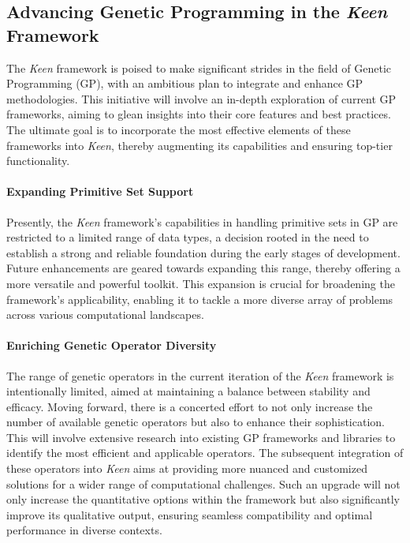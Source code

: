         \subsection{Advancing Genetic Programming in the \textit{Keen} Framework}
        \label{sec:future:gp}
            The \textit{Keen} framework is poised to make significant strides in the field of Genetic Programming (GP), 
            with an ambitious plan to integrate and enhance GP methodologies. This initiative will involve an in-depth 
            exploration of current GP frameworks, aiming to glean insights into their core features and best practices. 
            The ultimate goal is to incorporate the most effective elements of these frameworks into \textit{Keen}, 
            thereby augmenting its capabilities and ensuring top-tier functionality.
        
            \paragraph{Expanding Primitive Set Support}
                Presently, the \textit{Keen} framework's capabilities in handling primitive sets in GP are restricted to 
                a limited range of data types, a decision rooted in the need to establish a strong and reliable 
                foundation during the early stages of development. Future enhancements are geared towards expanding this 
                range, thereby offering a more versatile and powerful toolkit. This expansion is crucial for broadening 
                the framework's applicability, enabling it to tackle a more diverse array of problems across various 
                computational landscapes.
        
            \paragraph{Enriching Genetic Operator Diversity}
                The range of genetic operators in the current iteration of the \textit{Keen} framework is intentionally 
                limited, aimed at maintaining a balance between stability and efficacy. Moving forward, there is a 
                concerted effort to not only increase the number of available genetic operators but also to enhance 
                their sophistication. This will involve extensive research into existing GP frameworks and libraries to 
                identify the most efficient and applicable operators. The subsequent integration of these operators into 
                \textit{Keen} aims at providing more nuanced and customized solutions for a wider range of computational 
                challenges. Such an upgrade will not only increase the quantitative options within the framework but 
                also significantly improve its qualitative output, ensuring seamless compatibility and optimal 
                performance in diverse contexts.
        
